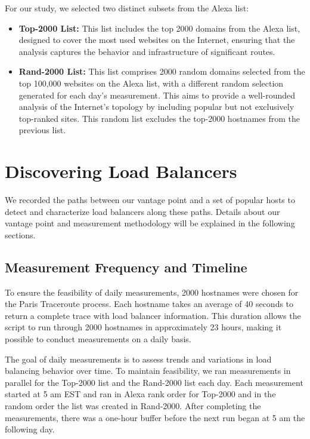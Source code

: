 \documentclass[12pt]{cwru_thesis}
\begin{document}
For our study, we selected two distinct subsets from the Alexa list:
\begin{itemize}
    \item \textbf{Top-2000 List:} This list includes the top 2000 domains from the Alexa list, designed to cover the most used websites on the Internet, ensuring that the analysis captures the behavior and infrastructure of significant routes.
    \item \textbf{Rand-2000 List:} This list comprises 2000 random domains selected from the top 100,000 websites on the Alexa list, with a different random selection generated for each day's measurement. This aims to provide a well-rounded analysis of the Internet's topology by including popular but not exclusively top-ranked sites. This random list excludes the top-2000 hostnames from the previous list.
\end{itemize}

\section{Discovering Load Balancers}

We recorded the paths between our vantage point and a set of popular hosts to detect and characterize load balancers along these paths. Details about our vantage point and measurement methodology will be explained in the following sections.



\subsection{Measurement Frequency and Timeline}
\label{subsec:freq}


To ensure the feasibility of daily measurements, 2000 hostnames were chosen for the Paris Traceroute process. Each hostname takes an average of 40 seconds to return a complete trace with load balancer information. This duration allows the script to run through 2000 hostnames in approximately 23 hours, making it possible to conduct measurements on a daily basis.

The goal of daily measurements is to assess trends and variations in load balancing behavior over time. To maintain feasibility, we ran measurements in parallel for the Top-2000 list and the Rand-2000 list each day. Each measurement started at 5 am EST and ran in Alexa rank order for Top-2000 and in the random order the list was created in Rand-2000. After completing the measurements, there was a one-hour buffer before the next run began at 5 am the following day.
\end{document}
